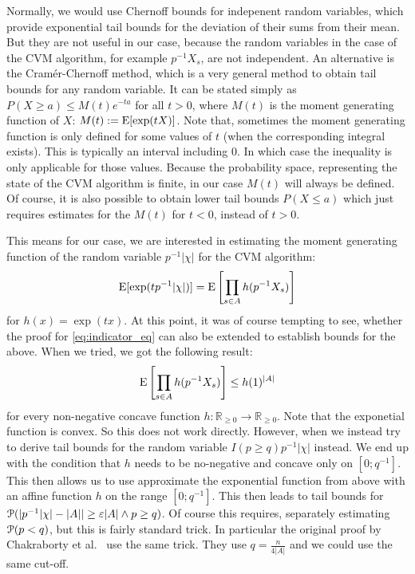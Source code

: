 Normally, we would use Chernoff bounds for indepenent random variables, which provide exponential tail bounds for the deviation of their sums from their mean.
But they are not useful in our case, because the random variables in the case of the CVM algorithm, for example $p^{-1} X_s$, are not independent.
An alternative is the Cram\'{e}r-Chernoff method, which is a very general method to obtain tail bounds for any random variable.
It can be stated simply as $P(X \geq a) \leq M(t) e^{-ta}$ for all $t > 0$, where $M(t)$ is the moment generating function of $X$: $M(t) := \operatorname{\mathrm{E}} [\exp(t X)]$.
Note that, sometimes the moment generating function is only defined for some values of $t$ (when the corresponding integral exists).
This is typically an interval including $0$.
In which case the inequality is only applicable for those values.
Because the probability space, representing the state of the CVM algorithm is finite, in our case $M(t)$ will always be defined.
Of course, it is also possible to obtain lower tail bounds $P(X \leq a)$ which just requires estimates for the $M(t)$ for $t < 0$, instead of $t > 0$.

This means for our case, we are interested in estimating the moment generating function of the random variable $p^{-1} |\chi|$ for the CVM algorithm:
\[
  \operatorname{\mathrm{E}} [\exp( t p^{-1} |\chi| )] = \operatorname{\mathrm{E}} \left[ \prod_{s \in A} h(p^{-1} X_s) \right]
\]
for $h(x) = \exp(tx)$.
At this point, it was of course tempting to see, whether the proof for \cref{eq:indicator_eq} can also be extended to establish bounds for the above.
When we tried, we got the following result:
\[
  \operatorname{\mathrm{E}} \left[ \prod_{s \in A} h(p^{-1} X_s) \right] \leq h(1)^{|A|}
\]
for every non-negative concave function $h : \mathbb R_{\geq 0} \rightarrow \mathbb R_{\geq 0}$.
Note that the exponetial function is convex.
So this does not work directly.
However, when we instead try to derive tail bounds for the random variable $I(p \geq q) p^{-1} |\chi|$ instead. 
We end up with the condition that $h$ needs to be no-negative and concave only on $[0;q^{-1}]$.
This then allows us to use approximate the exponential function from above with an affine function $h$ on the range $[0;q^{-1}]$.
This then leads to tail bounds for $\operatorname{\mathcal P}( |p^{-1} |\chi| - |A|| \geq \varepsilon |A| \wedge p \geq q)$.
Of course this requires, separately estimating $\operatorname{\mathcal P}(p < q)$, but this is fairly standard trick.
In particular the original proof by Chakraborty et al.~\cite{chakraborty2022} use the same trick.
They use $q = \frac{n}{4 |A|}$ and we could use the same cut-off.

